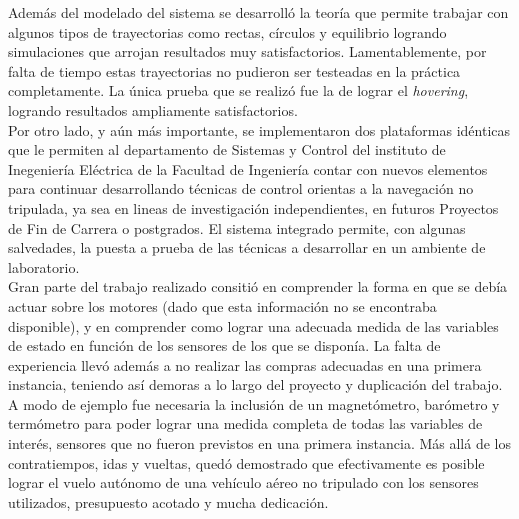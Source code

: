 \documentclass[main]{subfiles}
\begin{document}
Adem\'as del modelado del sistema se desarroll\'o la teor\'ia que permite trabajar con algunos tipos de trayectorias como rectas, c\'irculos y equilibrio logrando simulaciones que arrojan resultados muy satisfactorios. Lamentablemente, por falta de tiempo estas trayectorias no pudieron ser testeadas en la pr\'actica completamente. La \'unica prueba que se realiz\'o fue la de lograr el \emph{hovering}, logrando resultados ampliamente satisfactorios.\\

Por otro lado, y aún más importante, se implementaron dos plataformas id\'enticas que le permiten al departamento de Sistemas y Control del instituto de Inegenier\'ia El\'ectrica de la Facultad de Ingenier\'ia contar con nuevos elementos para continuar desarrollando t\'ecnicas de control orientas a la navegaci\'on no tripulada, ya sea en lineas de investigaci\'on independientes, en futuros Proyectos de Fin de Carrera o postgrados. El sistema integrado permite, con algunas salvedades, la puesta a prueba de las t\'ecnicas a desarrollar en un ambiente de laboratorio.\\

Gran parte del trabajo realizado consiti\'o en comprender la forma en que se deb\'ia actuar sobre los motores (dado que esta informaci\'on no se encontraba disponible), y en comprender como lograr una adecuada medida de las variables de estado en funci\'on de los sensores de los que se dispon\'ia. La falta de experiencia llev\'o adem\'as a no realizar las compras adecuadas en una primera instancia, teniendo as\'i demoras a lo largo del proyecto y duplicaci\'on del trabajo. A modo de ejemplo fue necesaria la inclusión de un magnetómetro, barómetro y termómetro para poder lograr una medida completa de todas las variables de interés, sensores que no fueron previstos en una primera instancia. Más allá de los contratiempos, idas y vueltas, quedó demostrado que efectivamente es posible lograr el vuelo autónomo de una vehículo aéreo no tripulado con los sensores utilizados, presupuesto acotado y mucha dedicación.\\

\end{document}
